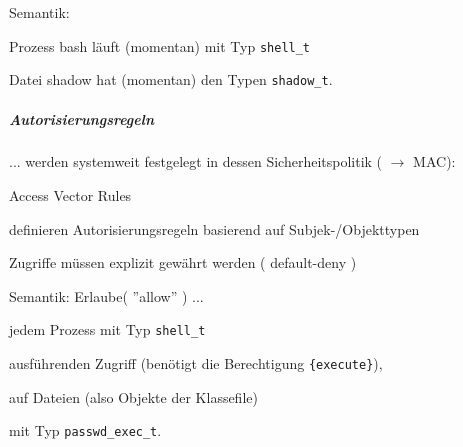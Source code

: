 \documentclass[a4paper]{article}
\begin{document}
\begin{multicols}{3}

    \begin{itemize*}
        \item
        Semantik:
        \begin{itemize*}
            \item Prozess bash läuft (momentan) mit Typ \texttt{shell\_t}
            \item Datei shadow hat (momentan) den Typen \texttt{shadow\_t}.
        \end{itemize*}
    \end{itemize*}


    \subparagraph{Autorisierungsregeln}

    ... werden systemweit festgelegt in dessen Sicherheitspolitik
    ( $\rightarrow$ MAC):

    Access Vector Rules

    \begin{itemize*}
        \item
        definieren Autorisierungsregeln basierend auf Subjek-/Objekttypen
        \item
        Zugriffe müssen explizit gewährt werden ( default-deny )

        \item
        Semantik: Erlaube( ''allow'' ) ...
        \begin{itemize*}
            \item jedem Prozess mit Typ \texttt{shell\_t}
            \item ausführenden Zugriff (benötigt die Berechtigung \texttt{\{execute\}}),
            \item auf Dateien (also Objekte der Klassefile)
            \item mit Typ \texttt{passwd\_exec\_t}.
        \end{itemize*}
    \end{itemize*}



\end{multicols}
\end{document}
